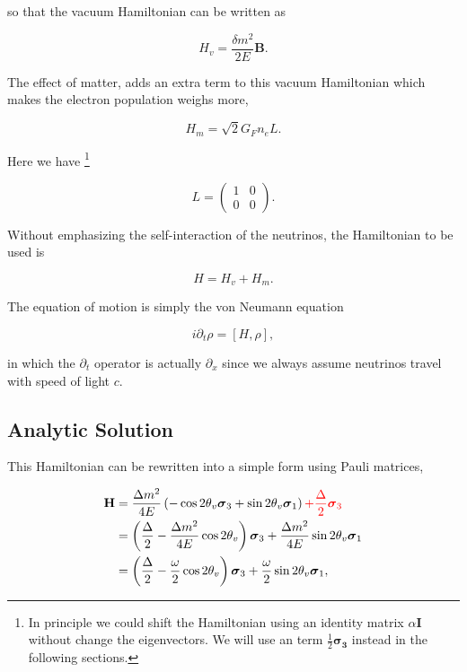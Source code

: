 \documentclass{tufte-handout}
\begin{document}
so that the vacuum Hamiltonian can be written as

\begin{equation*}
H_v = \frac{ \delta m^2 }{2E}\mathbf B.
\end{equation*}

The effect of matter, adds an extra term to this vacuum Hamiltonian which makes the electron population weighs more,

\begin{equation*}
H_m = \sqrt{2}G_F n_e L.
\end{equation*}

Here we have \footnote{In principle we could shift the Hamiltonian using an identity matrix $\alpha \mathbf{I}$ without change the eigenvectors. We will use an term $\frac{1}{2}\mathbf{\sigma_3} $ instead in the following sections.}

\begin{equation*}
L = \begin{pmatrix} 1 & 0 \\ 0 & 0 \end{pmatrix}.
\end{equation*}


Without emphasizing the self-interaction of the neutrinos, the Hamiltonian to be used is

\begin{equation}
H = H_v + H_m.
\end{equation}

The equation of motion is simply the von Neumann equation

\begin{equation}
i \partial_t \rho = \left[ H , \rho\right],
\end{equation}

in which the $\partial_t$ operator is actually $\partial_x$ since we always assume neutrinos travel with speed of light $c$.


\subsection{Analytic Solution}


This Hamiltonian can be rewritten into a simple form using Pauli matrices,

\begin{align*}
\mathbf H &= \frac{ \Delta m^2 }{4E} \left( -\cos 2\theta_v \boldsymbol {\sigma}_3  + \sin 2\theta_v \boldsymbol{\sigma}_1 \right)  {\color{red} + \frac{\Delta}{2} \boldsymbol{\sigma}_3 } \\
& = \left(\frac{\Delta}{2} -\frac{ \Delta m^2 }{4E} \cos 2\theta_v \right) \boldsymbol{\sigma}_3  + \frac{ \Delta m^2 }{4E} \sin 2\theta_v \boldsymbol{\sigma}_1 \\
& = \left(\frac{\Delta}{2} -\frac{ \omega }{2} \cos 2\theta_v \right) \boldsymbol{\sigma}_3  + \frac{ \omega }{2} \sin 2\theta_v \boldsymbol{\sigma}_1,
\end{align*}
\end{document}
